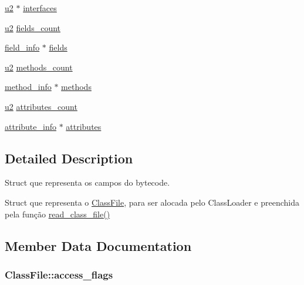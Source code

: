 \begin{DoxyCompactItemize}
\item 
\hyperlink{structures_8h_a55ef8d87fd202b8417704c089899c5b9}{u2} $\ast$ \hyperlink{structClassFile_af599de97e062c98966470f1590496425}{interfaces}
\item 
\hyperlink{structures_8h_a55ef8d87fd202b8417704c089899c5b9}{u2} \hyperlink{structClassFile_acea207ee523fbc16611d3cf436c390e0}{fields\+\_\+count}
\item 
\hyperlink{structfield__info}{field\+\_\+info} $\ast$ \hyperlink{structClassFile_aa324f88c75aa96c632f8c57d010aab0c}{fields}
\item 
\hyperlink{structures_8h_a55ef8d87fd202b8417704c089899c5b9}{u2} \hyperlink{structClassFile_aacfb45d4af64216324b1ae5269c870d5}{methods\+\_\+count}
\item 
\hyperlink{structmethod__info}{method\+\_\+info} $\ast$ \hyperlink{structClassFile_ad061f06cd709d10dbfbf82f443e43632}{methods}
\item 
\hyperlink{structures_8h_a55ef8d87fd202b8417704c089899c5b9}{u2} \hyperlink{structClassFile_a633c696fbe08e7e7906b2ab1e52f3d1b}{attributes\+\_\+count}
\item 
\hyperlink{structattribute__info}{attribute\+\_\+info} $\ast$ \hyperlink{structClassFile_a8bf809db8e1008f401dc3cda5e9cdb14}{attributes}
\end{DoxyCompactItemize}


\subsection{Detailed Description}
Struct que representa os campos do bytecode. 

Struct que representa o \hyperlink{structClassFile}{Class\+File}, para ser alocada pelo Class\+Loader e preenchida pela função \hyperlink{classfile_8c_a14c4d3f84dd03a43aca0a57bd530f3a2}{read\+\_\+class\+\_\+file()} 

\subsection{Member Data Documentation}
\subsubsection[{\texorpdfstring{access\+\_\+flags}{access_flags}}]{ Class\+File\+::access\+\_\+flags}\hypertarget{structClassFile_ae88db578147f7ee0d6fc1aeacb341854}{}\label{structClassFile_ae88db578147f7ee0d6fc1aeacb341854}
